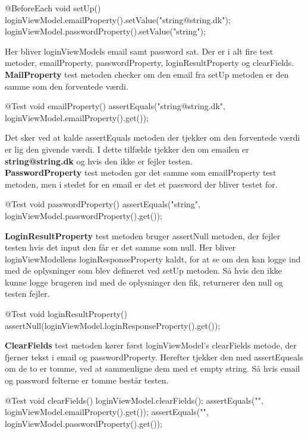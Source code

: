 \begin{code}[caption=LoginViewModel.java, firstnumber=28]
@BeforeEach
void setUp() {
    loginViewModel.emailProperty().setValue("string@string.dk");
    loginViewModel.passwordProperty().setValue("string");
}
\end{code}

Her bliver loginViewModels email samt password sat.
Der er i alt fire test metoder, emailProperty, passwordProperty, loginResultProperty og clearFields.\\
    
\textbf{MailProperty} test metoden checker om den email fra setUp metoden er den samme som den forventede værdi.\\


\begin{code}[caption=LoginViewModel.java, firstnumber=34]
@Test
void emailProperty() {
    assertEquals("string@string.dk", loginViewModel.emailProperty().get());
}
\end{code}

Det sker ved at kalde assertEquals metoden der tjekker om den forventede værdi er lig den givende værdi. I dette tilfælde tjekker den om emailen er \textbf{string@string.dk} og hvis den ikke er fejler testen.\\
    
\textbf{PasswordProperty} test metoden gør det samme som emailProperty test metoden, men i stedet for en email er det et password der bliver testet for.\\
\begin{code}[caption=LoginViewModel.java, firstnumber=39]
@Test
void passwordProperty() {
    assertEquals("string", loginViewModel.passwordProperty().get());
}
\end{code}
    
\textbf{LoginResultProperty} test metoden bruger assertNull metoden, der fejler testen hvis det input den får er det samme som null. Her bliver loginViewModellens loginResponseProperty kaldt, for at se om den kan logge ind med de oplysninger som blev defineret ved setUp metoden. Så hvis den ikke kunne logge brugeren ind med de oplysninger den fik, returnerer den null og testen fejler.\\

\begin{code}[caption=LoginViewModel.java, firstnumber=44]
@Test
void loginResultProperty() {
    assertNull(loginViewModel.loginResponseProperty().get());
}
\end{code}
    
\textbf{ClearFields} test metoden kører først loginViewModel’s clearFields metode, der fjerner tekst i email og passwordProperty. Herefter tjekker den med assertEqueals om de to er tomme, ved at sammenligne dem med et empty string. Så hvis email og password felterne er tomme består testen.\\

\begin{code}[caption=LoginViewModel.java, firstnumber=49]
@Test
void clearFields() {
    loginViewModel.clearFields();
    assertEquals("", loginViewModel.emailProperty().get());
    assertEquals("", loginViewModel.passwordProperty().get());
}
\end{code}